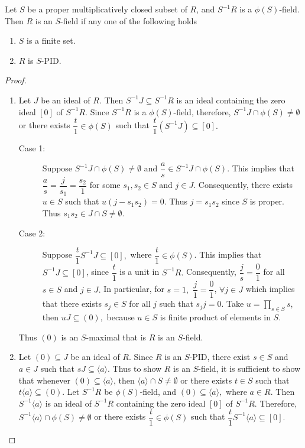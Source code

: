 \documentclass[11pt]{article}
\begin{document}
	\begin{theorem}\label{S-1r}
		Let $S$ be a proper multiplicatively closed subset of $R$, and $S^{-1}R$ is a $\phi(S)$-field. Then $R$ is an $S$-field if any one of the following holds
		\begin{enumerate}
			\item $S$ is a finite set.
			\item $R$ is $S$-PID.
		\end{enumerate}
	\end{theorem}
	\begin{proof}
		\begin{enumerate}
			\item Let $J$ be an ideal of $R$. Then $S^{-1}J\subseteq S^{-1}R$ is an ideal containing the zero ideal $[0]$ of $S^{-1}R.$ Since $S^{-1}R$ is a $\phi(S)$-field, therefore, $S^{-1}J\cap \phi(S)\neq \emptyset $ or there exists $\dfrac{t}{1}\in \phi(S)$ such that $\dfrac{t}{1}(S^{-1}J)\subseteq [0].$
			\begin{description}
				\item[Case 1:] Suppose $S^{-1}J\cap \phi(S)\neq \emptyset$ and $\dfrac{a}{s}\in S^{-1}J\cap \phi(S).$ This implies that $\dfrac{a}{s}=\dfrac{j}{s_1}=\dfrac{s_2}{1}$ for some $s_1,s_2\in S$ and $j\in J.$ Consequently, there exists $u\in S$ such that $u(j-s_1s_2)=0$. Thus $j=s_1s_2$ since $S$ is proper. Thus $s_1s_2\in J\cap S\neq \emptyset$.
				\item[Case 2:] Suppose $\dfrac{t}{1}S^{-1}J\subseteq [0],$ where $\dfrac{t}{1}\in \phi(S)$. This implies that $S^{-1}J\subseteq [0]$, since $\dfrac{t}{1}$ is a unit in $S^{-1}R.$ Consequently, $\dfrac{j}{s}=\dfrac{0}{1}$ for all $s\in S$ and $j\in J.$ In particular, for $s=1,$ $\dfrac{j}{1}=\dfrac{0}{1}$, $\forall j\in J$ which implies that there exists $s_j\in S$ for all $j$ such that $s_j j=0.$ Take $u=\prod_{s\in S} s$, then $uJ\subseteq (0),$ because $u\in S$ is finite product of elements in $S.$
			\end{description}
			Thus $(0)$ is an $S$-maximal that is $R$ is an $S$-field.
			\item Let $(0)\subseteq J$ be an ideal of $R.$ Since $R$ is an $S$-PID, there exist $s\in S$ and $a\in J$ such that $sJ\subseteq \langle a\rangle.$ Thus to show $R$ is an $S$-field, it is sufficient to show that whenever $(0)\subseteq \langle a\rangle$, then $\langle a\rangle \cap S\neq \emptyset$ or there exists $t\in S$ such that $t\langle a\rangle\subseteq (0).$ 
			Let $S^{-1}R$ be $\phi(S)$-field, and $(0)\subseteq \langle a\rangle,$ where $a\in R$. Then $S^{-1}\langle a \rangle$ is an ideal of $S^{-1}R$ containing the zero ideal $[0]$ of $S^{-1}R.$ Therefore, $S^{-1}\langle a\rangle\cap\phi(S)\neq \emptyset$ or there exists $\dfrac{t}{1}\in \phi(S)$ such that $\dfrac{t}{1}S^{-1}\langle a\rangle \subseteq [0].$

\end{enumerate}
\end{proof}
\end{document}
